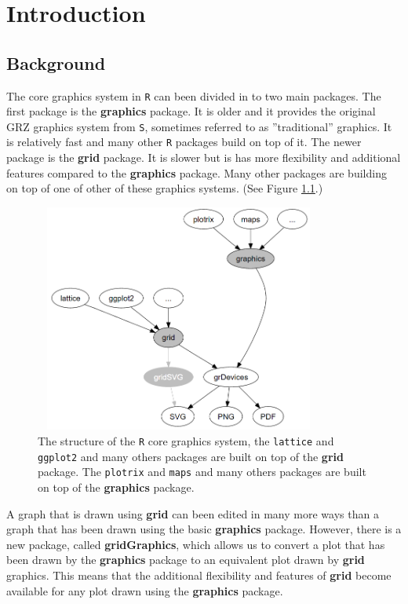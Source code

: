 \documentclass[11pt]{report}
\begin{document}
\chapter{Introduction}
\section{Background}
The core graphics system in \texttt{R} \citep{R2017} can been divided in to two main packages. The first package is the \textbf{graphics} package. It is older and it provides the original GRZ graphics system from \texttt{S}, sometimes referred to as ''traditional'' graphics. It is relatively fast and many other \texttt{R} packages build on top of it. The newer package is the \textbf{grid} package. It is slower but is has more flexibility and additional features compared to the \textbf{graphics} package. Many other packages are building on top of one of other of these graphics systems. (See Figure \ref{intro}.) \\

\begin{figure}[h]
	\begin{center}
		\includegraphics[height = 7.5cm, width = 9.5cm]{figure/intro.png}
		\caption{The structure of the \texttt{R} core graphics system, the \texttt{lattice} \citep{lattice}  and \texttt{ggplot2} \citep{ggplot2} and many others packages are built on top of the \textbf{grid} package. The \texttt{plotrix} \citep{plotrix} and \texttt{maps} \citep{maps} and many others packages are built on top of the \textbf{graphics} package. }
		\label{intro}
	\end{center}
\end{figure}

A graph that is drawn using \textbf{grid} can been edited in many more ways than a graph that has been drawn using the basic \textbf{graphics} package. However, there is a new package, called \textbf{gridGraphics}, which allows us to convert a plot that has been drawn by the \textbf{graphics} package to an equivalent plot drawn by \textbf{grid} graphics. This means that the additional flexibility and features of \textbf{grid} become available for any plot drawn using the \textbf{graphics} package. \\
\end{document}
